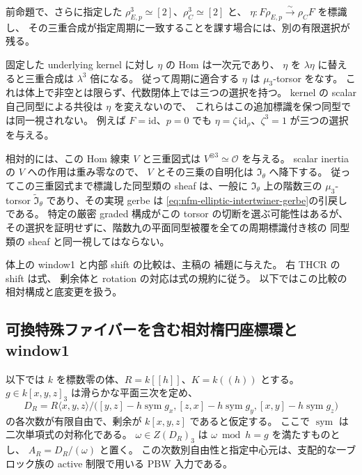 \begin{remark}
\label{rem:nfm-elliptic-period-phase}
前命題で、さらに指定した
$\rho_{E,p}^3\simeq[2]$、$\rho_C^3\simeq[2]$ と、
$\eta:F\rho_{E,p}\xrightarrow{\sim}\rho_CF$ を標識し、
その三重合成が指定周期に一致することを課す場合には、別の有限選択が残る。

固定した underlying kernel に対し $\eta$ の Hom は一次元であり、
$\eta$ を $\lambda\eta$ に替えると三重合成は $\lambda^3$ 倍になる。
従って周期に適合する $\eta$ は $\mu_3$-torsor をなす。
これは体上で非空とは限らず、代数閉体上では三つの選択を持つ。
kernel の scalar 自己同型による共役は $\eta$ を変えないので、
これらはこの追加標識を保つ同型では同一視されない。
例えば $F=\mathrm{id}$、$p=0$ でも
$\eta=\zeta\,\mathrm{id}_\rho$、$\zeta^3=1$ が三つの選択を与える。

相対的には、この Hom 線束 $V$ と三重図式は
$V^{\otimes3}\simeq\mathcal O$ を与える。
scalar inertia の $V$ への作用は重み零なので、
$V$ とその三乗の自明化は $\mathfrak I_\theta$ へ降下する。
従ってこの三重図式まで標識した同型類の sheaf は、一般に
$\mathfrak I_\theta$ 上の階数三の $\mu_3$-torsor
$\widetilde{\mathfrak I}_\theta$ であり、その実現 gerbe は
\eqref{eq:nfm-elliptic-intertwiner-gerbe}の引戻しである。
特定の厳密 graded 構成がこの torsor の切断を選ぶ可能性はあるが、
その選択を証明せずに、階数九の平面同型被覆を全ての周期標識付き核の
同型類の sheaf と同一視してはならない。
\end{remark}

体上の window1 と内部 shift の比較は、主稿の
補題に与えた。
右 THCR の shift は式、
剰余体と rotation の対応は式の規約に従う。
以下ではこの比較の相対構成と底変更を扱う。

\subsection{可換特殊ファイバーを含む相対楕円座標環と window1}

以下では $k$ を標数零の体、$R=k[[h]]$、$K=k((h))$ とする。
$g\in k[x,y,z]_3$ は滑らかな平面三次を定め、
\begin{equation}\label{eq:nfm-active-dvr-algebra}
 D_R=R\langle x,y,z\rangle/
 \bigl([y,z]-h\operatorname{sym}g_x,
       [z,x]-h\operatorname{sym}g_y,
       [x,y]-h\operatorname{sym}g_z\bigr)
\end{equation}
の各次数が有限自由で、剰余が $k[x,y,z]$ であると仮定する。
ここで $\operatorname{sym}$ は二次単項式の対称化である。
$\omega\in Z(D_R)_3$ は $\omega\bmod h=g$ を満たすものとし、
$A_R=D_R/(\omega)$ と置く。
この次数別自由性と指定中心元は、支配的な一ブロック族の active 制限で用いる PBW 入力である。

